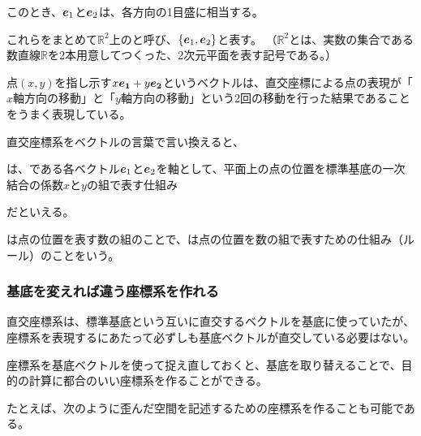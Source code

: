 \documentclass[../imaging-math]{subfiles}
\begin{document}
このとき、$\vb*{e}_1$と$\vb*{e}_2$は、各方向の1目盛に相当する。

これらをまとめて$\mathbb{R}^2$上のと呼び、$\left\{ \vb*{e}_1, \vb*{e}_2 \right\}$と表す。
（$\mathbb{R}^2$とは、実数の集合である数直線$\mathbb{R}$を2本用意してつくった、2次元平面を表す記号である。）

\br

点$(x,y)$を指し示す$x\vb*{e_1}+y\vb*{e_2}$というベクトルは、直交座標による点の表現が「$x$軸方向の移動」と「$y$軸方向の移動」という2回の移動を行った結果であることをうまく表現している。

\br

直交座標系をベクトルの言葉で言い換えると、
\begin{emphabox}
  は、である各ベクトル$\vb*{e}_1$と$\vb*{e}_2$を軸として、平面上の点の位置を標準基底の一次結合の係数$x$と$y$の組で表す仕組み
\end{emphabox}
だといえる。

\begin{supplnote}
  は点の位置を表す数の組のことで、は点の位置を数の組で表すための仕組み（ルール）のことをいう。
\end{supplnote}

\subsubsection{基底を変えれば違う座標系を作れる}

直交座標系は、標準基底という互いに直交するベクトルを基底に使っていたが、座標系を表現するにあたって必ずしも基底ベクトルが直交している必要はない。

\br

座標系を基底ベクトルを使って捉え直しておくと、基底を取り替えることで、目的の計算に都合のいい座標系を作ることができる。

たとえば、次のように歪んだ空間を記述するための座標系を作ることも可能である。
\end{document}
